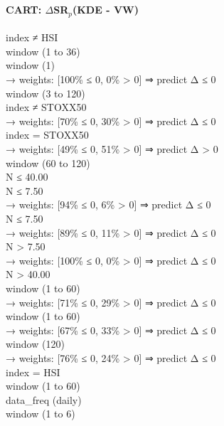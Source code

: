 \
\paragraph{CART: $\Delta$SR$_p$(KDE - VW)}

\begin{flushleft}
\ttfamily %
index ≠ HSI \\
\quad window (1 to 36) \\
\quad \quad window (1) \\
\quad \quad \quad \quad → weights: [100\% ≤ 0, 0\% > 0] ⇒ predict Δ ≤ 0 \\
\quad \quad window (3 to 120) \\
\quad \quad \quad index ≠ STOXX50 \\
\quad \quad \quad \quad → weights: [70\% ≤ 0, 30\% > 0] ⇒ predict Δ ≤ 0 \\
\quad \quad \quad index = STOXX50 \\
\quad \quad \quad \quad → weights: [49\% ≤ 0, 51\% > 0] ⇒ predict Δ > 0 \\
\quad window (60 to 120) \\
\quad \quad N ≤ 40.00 \\
\quad \quad \quad N ≤ 7.50 \\
\quad \quad \quad \quad → weights: [94\% ≤ 0, 6\% > 0] ⇒ predict Δ ≤ 0 \\
\quad \quad \quad N ≤ 7.50 \\
\quad \quad \quad \quad → weights: [89\% ≤ 0, 11\% > 0] ⇒ predict Δ ≤ 0 \\
\quad \quad \quad N > 7.50 \\
\quad \quad \quad \quad → weights: [100\% ≤ 0, 0\% > 0] ⇒ predict Δ ≤ 0 \\
\quad \quad N > 40.00 \\
\quad \quad \quad window (1 to 60) \\
\quad \quad \quad \quad → weights: [71\% ≤ 0, 29\% > 0] ⇒ predict Δ ≤ 0 \\
\quad \quad \quad window (1 to 60) \\
\quad \quad \quad \quad → weights: [67\% ≤ 0, 33\% > 0] ⇒ predict Δ ≤ 0 \\
\quad \quad \quad window (120) \\
\quad \quad \quad \quad → weights: [76\% ≤ 0, 24\% > 0] ⇒ predict Δ ≤ 0 \\
index = HSI \\
\quad window (1 to 60) \\
\quad \quad data\_freq (daily) \\
\quad \quad \quad window (1 to 6) \\

\end{flushleft}
